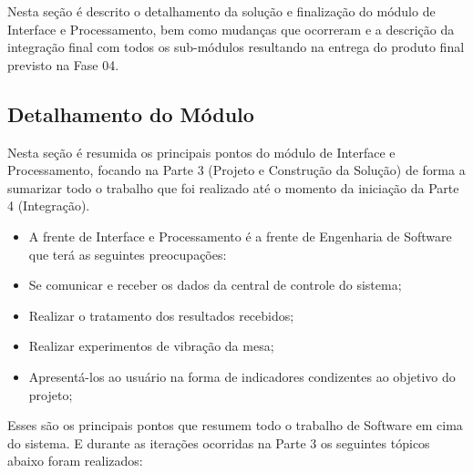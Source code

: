 \label{desenvolvimento_processamento}

Nesta seção é descrito o detalhamento da solução e finalização do módulo de Interface e Processamento, bem como mudanças que ocorreram e a descrição da integração final com todos os sub-módulos resultando na entrega do produto final previsto na Fase 04.

\subsection{Detalhamento do Módulo}

Nesta seção é resumida os principais pontos do módulo de Interface e Processamento, focando na Parte 3 (Projeto e Construção da Solução) de forma a sumarizar todo o trabalho que foi realizado até o momento da iniciação da Parte 4 (Integração).

\begin{itemize}
  \item A frente de Interface e Processamento é a frente de Engenharia de Software que terá as seguintes preocupações:
  \item Se comunicar e receber os dados da central de controle do sistema;
  \item Realizar o tratamento dos resultados recebidos;
  \item Realizar experimentos de vibração da mesa;
  \item Apresentá-los ao usuário na forma de indicadores condizentes ao objetivo do projeto;
\end{itemize}

Esses são os principais pontos que resumem todo o trabalho de Software em cima do sistema. E durante as iterações ocorridas na Parte 3 os seguintes tópicos abaixo foram realizados:

